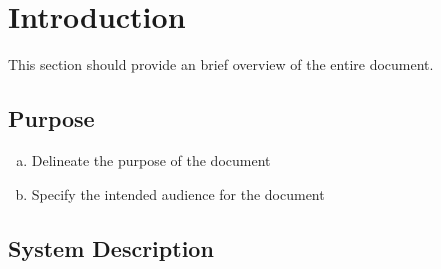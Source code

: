 \documentclass[english]{article}
\begin{document}
\vspace*{\fill} 
\vspace*{\fill} 

\newpage

\tableofcontents

\newpage

\setcounter{page}{1}
\raggedright    

\section{Introduction}
\label{sec:introduction}

This section should provide an brief overview of the entire document.

\subsection{Purpose}
\label{sub:purpose}
\begin{enumerate}[a)]
    \item Delineate the purpose of the document
    \item Specify the intended audience for the document
\end{enumerate}

\subsection{System Description}
\label{sub:system_description}
\end{document}

